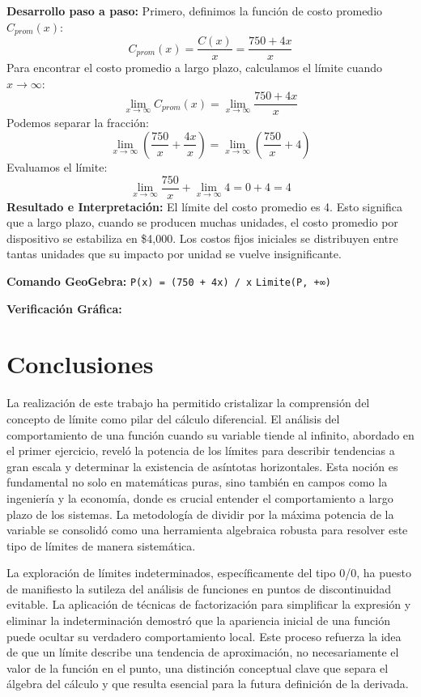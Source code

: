 \documentclass{article}
\begin{document}
\textbf{Desarrollo paso a paso:}
Primero, definimos la función de costo promedio $C_{prom}(x)$:
\[ C_{prom}(x) = \frac{C(x)}{x} = \frac{750 + 4x}{x} \]
Para encontrar el costo promedio a largo plazo, calculamos el límite cuando $x \to \infty$:
\[ \lim_{x \to \infty} C_{prom}(x) = \lim_{x \to \infty} \frac{750 + 4x}{x} \]
Podemos separar la fracción:
\[ \lim_{x \to \infty} \left( \frac{750}{x} + \frac{4x}{x} \right) = \lim_{x \to \infty} \left( \frac{750}{x} + 4 \right) \]
Evaluamos el límite:
\[ \lim_{x \to \infty} \frac{750}{x} + \lim_{x \to \infty} 4 = 0 + 4 = 4 \]
\textbf{Resultado e Interpretación:} El límite del costo promedio es 4. Esto significa que a largo plazo, cuando se producen muchas unidades, el costo promedio por dispositivo se estabiliza en \$4,000. Los costos fijos iniciales se distribuyen entre tantas unidades que su impacto por unidad se vuelve insignificante.

\textbf{Comando GeoGebra:}
\texttt{P(x) = (750 + 4x) / x}
\texttt{Limite(P, +∞)}

\textbf{Verificación Gráfica:}

\newpage

\section*{Conclusiones}

La realización de este trabajo ha permitido cristalizar la comprensión del concepto de límite como pilar del cálculo diferencial. El análisis del comportamiento de una función cuando su variable tiende al infinito, abordado en el primer ejercicio, reveló la potencia de los límites para describir tendencias a gran escala y determinar la existencia de asíntotas horizontales. Esta noción es fundamental no solo en matemáticas puras, sino también en campos como la ingeniería y la economía, donde es crucial entender el comportamiento a largo plazo de los sistemas. La metodología de dividir por la máxima potencia de la variable se consolidó como una herramienta algebraica robusta para resolver este tipo de límites de manera sistemática.

La exploración de límites indeterminados, específicamente del tipo 0/0, ha puesto de manifiesto la sutileza del análisis de funciones en puntos de discontinuidad evitable. La aplicación de técnicas de factorización para simplificar la expresión y eliminar la indeterminación demostró que la apariencia inicial de una función puede ocultar su verdadero comportamiento local. Este proceso refuerza la idea de que un límite describe una tendencia de aproximación, no necesariamente el valor de la función en el punto, una distinción conceptual clave que separa el álgebra del cálculo y que resulta esencial para la futura definición de la derivada.
\end{document}
